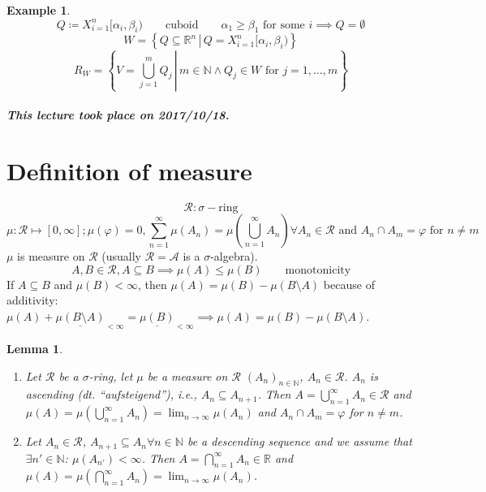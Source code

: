 \documentclass{article}
\newtheorem{example}{Example}  \numberwithin{example}{section}
\newtheorem{lemma}{Lemma}  \numberwithin{lemma}{section}
\newcommand{\setdef}[2]{\left\{\left.#1\,\right|\,#2\right\}}
\newcommand{\dateref}[1]{\paragraph{\textit{This lecture took place on #1.}}}
\begin{document}

\begin{example}
  \[ Q \coloneqq X_{i=1}^n [\alpha_i, \beta_i) \qquad \text{cuboid} \qquad \alpha_1 \geq \beta_1 \text{ for some } i \implies Q = \emptyset \]
  \[ W = \setdef{Q \subseteq \mathbb R^n}{Q = X_{i=1}^n [\alpha_i, \beta_i)} \]
  \[ R_W = \setdef{V = \bigcup_{j=1}^m Q_j}{m \in \mathbb N \land Q_j \in W \text{ for } j = 1,\ldots,m} \]
\end{example}

\dateref{2017/10/18}
\section{Definition of measure}
\[ \mathcal R: \sigma-\text{ring} \]
\[
    \mu: \mathcal R \mapsto [0, \infty];
    \mu(\varphi) = 0,
    \sum_{n=1}^\infty \mu(A_n) = \mu(\bigcup_{n=1}^\infty A_n) \forall A_n \in \mathcal R \text{ and } A_n \cap A_m = \varphi \text{ for } n \neq m
\]
$\mu$ is measure on $\mathcal R$ (usually $\mathcal R = \mathcal A$ is a $\sigma$-algebra).
\[ A, B \in \mathcal R, A \subseteq B \implies \mu(A) \leq \mu(B) \qquad \text{monotonicity} \]
If $A \subseteq B$ and $\mu(B) < \infty$, then $\mu(A) = \mu(B) - \mu(B \setminus A)$
because of additivity: $\mu(A) + \underline{\mu(B \setminus A)}_{< \infty} = \underline{\mu(B)}_{< \infty} \implies \mu(A) = \mu(B) - \mu(B \setminus A)$.

\begin{lemma}
  \label{l:nine}
  \begin{enumerate}
    \item
      Let $\mathcal R$ be a $\sigma$-ring, let $\mu$ be a measure on $\mathcal R$ $(A_n)_{n \in \mathbb N}$, $A_n \in \mathcal R$.
      $A_n$ is ascending (dt. \enquote{aufsteigend}), i.e., $A_n \subseteq A_{n+1}$. Then $A = \bigcup_{n=1}^\infty A_n \in \mathcal R$
      and $\mu(A) = \mu\left(\bigcup_{n=1}^\infty A_n\right) = \lim_{n \to \infty} \mu(A_n)$
      and $A_n \cap A_m = \varphi$ for $n \neq m$.
    \item
      Let $A_n \in \mathcal R$, $A_{n+1} \subseteq A_n \forall n \in \mathbb N$ be a descending sequence
      and we assume that $\exists n' \in \mathbb N$: $\mu(A_{n'}) < \infty$.
      Then $A = \bigcap_{n=1}^\infty A_n \in \mathbb R$ and $\mu(A) = \mu(\bigcap_{n=1}^\infty A_n) = \lim_{n\to\infty} \mu(A_n)$.
  \end{enumerate}
\end{lemma}
\end{document}

